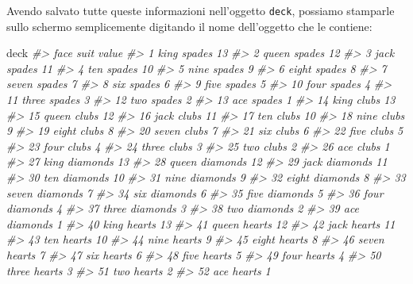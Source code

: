 \documentclass[
  11pt,
]{krantz}
\makeatletter
\newenvironment{Shaded}{\begin{snugshade}}{\end{snugshade}}
\newcommand{\CommentTok}[1]{\textcolor[rgb]{0.37,0.37,0.37}{\textit{#1}}}
\newcommand{\NormalTok}[1]{#1}
\newenvironment{kframe}{%
\medskip{}
\setlength{\fboxsep}{.8em}
 \def\at@end@of@kframe{}%
 \ifinner\ifhmode%
  \def\at@end@of@kframe{\end{minipage}}%
  \begin{minipage}{\columnwidth}%
 \fi\fi%
 \def\FrameCommand##1{\hskip\@totalleftmargin \hskip-\fboxsep
 \colorbox{shadecolor}{##1}\hskip-\fboxsep
     \hskip-\linewidth \hskip-\@totalleftmargin \hskip\columnwidth}%
 \MakeFramed {\advance\hsize-\width
   \@totalleftmargin\z@ \linewidth\hsize
   \@setminipage}}%
 {\par\unskip\endMakeFramed%
 \at@end@of@kframe}
\renewenvironment{Shaded}{\begin{kframe}}{\end{kframe}}
\theoremstyle{definition}
\theoremstyle{definition}
\theoremstyle{definition}
\theoremstyle{definition}
\theoremstyle{remark}
\makeatother
\begin{document}
Avendo salvato tutte queste informazioni nell'oggetto \texttt{deck}, possiamo stamparle sullo schermo semplicemente digitando il nome dell'oggetto che le contiene:

\begin{Shaded}
\begin{Highlighting}[]
\NormalTok{deck}
\CommentTok{\#\textgreater{}     face     suit value}
\CommentTok{\#\textgreater{} 1   king   spades    13}
\CommentTok{\#\textgreater{} 2  queen   spades    12}
\CommentTok{\#\textgreater{} 3   jack   spades    11}
\CommentTok{\#\textgreater{} 4    ten   spades    10}
\CommentTok{\#\textgreater{} 5   nine   spades     9}
\CommentTok{\#\textgreater{} 6  eight   spades     8}
\CommentTok{\#\textgreater{} 7  seven   spades     7}
\CommentTok{\#\textgreater{} 8    six   spades     6}
\CommentTok{\#\textgreater{} 9   five   spades     5}
\CommentTok{\#\textgreater{} 10  four   spades     4}
\CommentTok{\#\textgreater{} 11 three   spades     3}
\CommentTok{\#\textgreater{} 12   two   spades     2}
\CommentTok{\#\textgreater{} 13   ace   spades     1}
\CommentTok{\#\textgreater{} 14  king    clubs    13}
\CommentTok{\#\textgreater{} 15 queen    clubs    12}
\CommentTok{\#\textgreater{} 16  jack    clubs    11}
\CommentTok{\#\textgreater{} 17   ten    clubs    10}
\CommentTok{\#\textgreater{} 18  nine    clubs     9}
\CommentTok{\#\textgreater{} 19 eight    clubs     8}
\CommentTok{\#\textgreater{} 20 seven    clubs     7}
\CommentTok{\#\textgreater{} 21   six    clubs     6}
\CommentTok{\#\textgreater{} 22  five    clubs     5}
\CommentTok{\#\textgreater{} 23  four    clubs     4}
\CommentTok{\#\textgreater{} 24 three    clubs     3}
\CommentTok{\#\textgreater{} 25   two    clubs     2}
\CommentTok{\#\textgreater{} 26   ace    clubs     1}
\CommentTok{\#\textgreater{} 27  king diamonds    13}
\CommentTok{\#\textgreater{} 28 queen diamonds    12}
\CommentTok{\#\textgreater{} 29  jack diamonds    11}
\CommentTok{\#\textgreater{} 30   ten diamonds    10}
\CommentTok{\#\textgreater{} 31  nine diamonds     9}
\CommentTok{\#\textgreater{} 32 eight diamonds     8}
\CommentTok{\#\textgreater{} 33 seven diamonds     7}
\CommentTok{\#\textgreater{} 34   six diamonds     6}
\CommentTok{\#\textgreater{} 35  five diamonds     5}
\CommentTok{\#\textgreater{} 36  four diamonds     4}
\CommentTok{\#\textgreater{} 37 three diamonds     3}
\CommentTok{\#\textgreater{} 38   two diamonds     2}
\CommentTok{\#\textgreater{} 39   ace diamonds     1}
\CommentTok{\#\textgreater{} 40  king   hearts    13}
\CommentTok{\#\textgreater{} 41 queen   hearts    12}
\CommentTok{\#\textgreater{} 42  jack   hearts    11}
\CommentTok{\#\textgreater{} 43   ten   hearts    10}
\CommentTok{\#\textgreater{} 44  nine   hearts     9}
\CommentTok{\#\textgreater{} 45 eight   hearts     8}
\CommentTok{\#\textgreater{} 46 seven   hearts     7}
\CommentTok{\#\textgreater{} 47   six   hearts     6}
\CommentTok{\#\textgreater{} 48  five   hearts     5}
\CommentTok{\#\textgreater{} 49  four   hearts     4}
\CommentTok{\#\textgreater{} 50 three   hearts     3}
\CommentTok{\#\textgreater{} 51   two   hearts     2}
\CommentTok{\#\textgreater{} 52   ace   hearts     1}
\end{Highlighting}
\end{Shaded}
\end{document}
